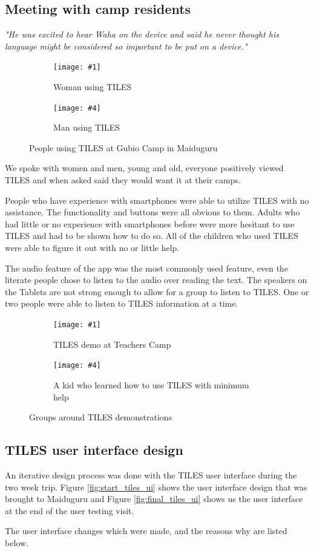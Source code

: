 \documentclass[11pt]{article}
\newcommand*{\twoImages}[8]{
	\begin{figure}[H]
		\centering
		  \begin{subfigure}{0.475\textwidth}
			\texttt{[image: \#1]}
			  \caption{#2}
			  \label{#3}
		  \end{subfigure}
		  \hfill
		  \begin{subfigure}{0.475\textwidth}
			\texttt{[image: \#4]}
			  \caption{#5}
			  \label{#6}
		  \end{subfigure}
	\caption{#7}
	\label{#8}
	\end{figure}
}
\begin{document}
\subsection{Meeting with camp residents}

\textit{"He was excited to hear Waha on the device and said he never thought his language might be considered so important to be put on a device."}

\twoImages{images/user_testing/woman_with_TILES.JPG}
{Woman using TILES}
{}
{images/user_testing/man_with_TILES.JPG}
{Man using TILES}
{}
{People using TILES at Gubio Camp in Maiduguru}
{}

We spoke with women and men, young and old, everyone positively viewed TILES and when asked said they would want it at their camps. 

People who have experience with smartphones were able to utilize TILES with no assistance. The functionality and buttons were all obvious to them. Adults who had little or no experience with smartphones before were more hesitant to use TILES and had to be shown how to do so. All of the children who used TILES were able to figure it out with no or little help.

The audio feature of the app was the most commonly used feature, even the literate people chose to listen to the audio over reading the text. The speakers on the Tablets are not strong enough to allow for a group to listen to TILES. One or two people were able to listen to TILES information at a time. 

\twoImages{images/user_testing/group_with_tiles.jpg}
{TILES demo at Teachers Camp}
{}
{images/user_testing/kid_sun_using_TILES.png}
{A kid who learned how to use TILES with minimum help}
{}
{Groups around TILES demonstrations}
{}
\subsection{TILES user interface design}

An iterative design process was done with the TILES user interface during the two week trip. Figure \ref{fig:start_tiles_ui} shows the user interface design that was brought to Maiduguru and Figure \ref{fig:final_tiles_ui} shows us the user interface at the end of the user testing visit. 

The user interface changes which were made, and the reasons why are listed below.
\end{document}
